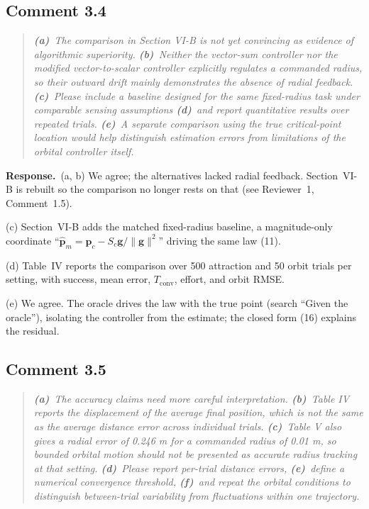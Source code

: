 \documentclass[10pt]{article}
\newcommand{\rev}[1]{#1}                             %
\newcommand{\resp}{\par\textbf{Response.}~}
\begin{document}
\subsection*{Comment 3.4}

\begin{quote}\itshape
\textbf{(a)}~The comparison in Section VI-B is not yet convincing as evidence of algorithmic superiority.
\textbf{(b)}~Neither the vector-sum controller nor the modified vector-to-scalar controller explicitly regulates a commanded radius, so their outward drift mainly demonstrates the absence of radial feedback.
\textbf{(c)}~Please include a baseline designed for the same fixed-radius task under comparable sensing assumptions
\textbf{(d)}~and report quantitative results over repeated trials.
\textbf{(e)}~A separate comparison using the true critical-point location would help distinguish estimation errors from limitations of the orbital controller itself.
\end{quote}

\resp (a, b) We agree; the alternatives lacked radial feedback. Section~VI-B is rebuilt so the comparison no longer rests on that (see Reviewer~1, Comment~1.5).

(c) Section~VI-B adds the matched fixed-radius baseline, a magnitude-only coordinate ``$\hat{\mathbf{p}}_m = \mathbf{p}_c - S_c\mathbf{g}/\|\mathbf{g}\|^2$'' driving the same law (11).

(d) Table~IV reports the comparison over \rev{500} attraction and \rev{50} orbit trials per setting, with success, mean error, $T_{\mathrm{conv}}$, effort, and orbit RMSE.

(e) We agree. The oracle drives the law with the true point (search ``Given the oracle''), isolating the controller from the estimate; the closed form (16) explains the residual.

\subsection*{Comment 3.5}

\begin{quote}\itshape
\textbf{(a)}~The accuracy claims need more careful interpretation.
\textbf{(b)}~Table IV reports the displacement of the average final position, which is not the same as the average distance error across individual trials.
\textbf{(c)}~Table V also gives a radial error of 0.246 m for a commanded radius of 0.01 m, so bounded orbital motion should not be presented as accurate radius tracking at that setting.
\textbf{(d)}~Please report per-trial distance errors,
\textbf{(e)}~define a numerical convergence threshold,
\textbf{(f)}~and repeat the orbital conditions to distinguish between-trial variability from fluctuations within one trajectory.
\end{quote}
\end{document}
